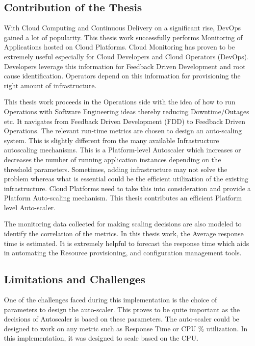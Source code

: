 \documentclass[article,type=msc,colorback,12pt,accentcolor=tud7b,table]{tudthesis}
\begin{document}
\subsection{Contribution of the Thesis}

With Cloud Computing and Continuous Delivery on a significant rise, DevOps gained a lot of popularity. This thesis work successfully performs Monitoring of Applications hosted on Cloud Platforms. Cloud Monitoring has proven to be extremely useful especially for Cloud Developers and Cloud Operators (DevOps). Developers leverage this information for Feedback Driven Development and root cause identification. Operators depend on this information for provisioning the right amount of infrastructure.

This thesis work proceeds in the Operations side with the idea of how to run Operations with Software Engineering ideas thereby reducing Downtime/Outages etc. It navigates from Feedback Driven Development (FDD) to Feedback Driven Operations. The relevant run-time metrics are chosen to design an auto-scaling system. This is slightly different from the many available Infrastructure autoscaling mechanisms. This is a Platform-level Autoscaler which increases or decreases the number of running application instances depending on the threshold parameters. Sometimes, adding infrastructure may not solve the problem whereas what is essential could be the efficient utilization of the existing infrastructure. Cloud Platforms need to take this into consideration and provide a Platform Auto-scaling mechanism. This thesis contributes an efficient Platform level Auto-scaler. 

The monitoring data collected for making scaling decisions are also modeled to identify the correlation of the metrics. In this thesis work, the Average response time is estimated. It is extremely helpful to forecast the response time which aids in automating the Resource provisioning, and configuration management tools. 

 \subsection{Limitations and Challenges}	
 
 One of the challenges faced during this implementation is the choice of parameters to design the auto-scaler. This proves to be quite important as the decisions of Autoscaler is based on these parameters. The auto-scaler could be designed to work on any metric such as Response Time or CPU \% utilization. In this implementation, it was designed to scale based on the CPU. 
 
\end{document}
